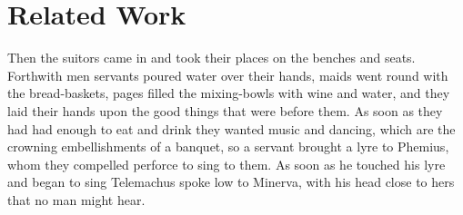 \section{Related Work}

Then the suitors came in and took their places on the benches and seats.
Forthwith men servants poured water over their hands, maids went round with
the bread-baskets, pages filled the mixing-bowls with wine and water, and they
laid their hands upon the good things that were before them. As soon as they
had had enough to eat and drink they wanted music and dancing, which are the
crowning embellishments of a banquet, so a servant brought a lyre to Phemius,
whom they compelled perforce to sing to them. As soon as he touched his lyre
and began to sing Telemachus spoke low to Minerva, with his head close to hers
that no man might hear.
